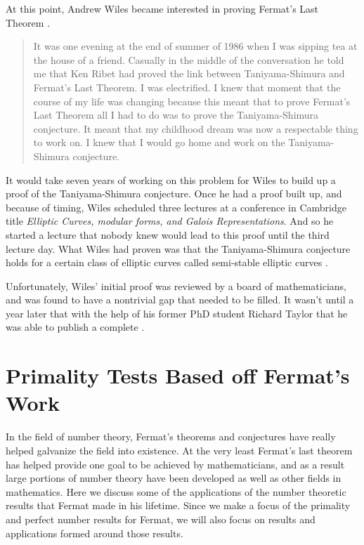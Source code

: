 \documentclass[11pt]{article}
\begin{document}
At this point, Andrew Wiles became interested in proving Fermat's Last
Theorem \cite{Kleiner}.
\begin{quote}
    It was one evening at the end of summer of 1986 when I was sipping tea
    at the house of a friend.
    Casually in the middle of the conversation he told me that Ken Ribet had
    proved the link between Taniyama-Shimura and Fermat's Last Theorem.
    I was electrified.
    I knew that moment that the course of my life was changing because this
    meant that to prove Fermat's Last Theorem all I had to do was to
    prove the Taniyama-Shimura conjecture.
    It meant that my childhood dream was now a respectable thing to work on.
    I knew that I would go home and work on the Taniyama-Shimura conjecture.
\end{quote}
It would take seven years of working on this problem for Wiles to build up a
proof of the Taniyama-Shimura conjecture.
Once he had a proof built up, and because of timing, Wiles scheduled three
lectures at a conference in Cambridge title \emph{Elliptic Curves, modular forms, and
Galois Representations}.
And so he started a lecture that nobody knew would lead to this proof until the
third lecture day.
What Wiles had proven was that the Taniyama-Shimura conjecture holds for a certain
class of elliptic curves called semi-stable elliptic curves \cite{Kleiner}.

Unfortunately, Wiles' initial proof was reviewed by a board of mathematicians, and
was found to have a nontrivial gap that needed to be filled.
It wasn't until a year later that with the help of his former PhD student 
Richard Taylor that he was able to publish a complete \cite{Kleiner}.


\section*{Primality Tests Based off Fermat's Work}
In the field of number theory, Fermat's theorems and conjectures have really
helped galvanize the field into existence.
At the very least Fermat's last theorem has helped provide one goal to be achieved
by mathematicians, and as a result large portions of number theory have been developed
as well as other fields in mathematics.
Here we discuss some of the applications of the number theoretic
results that Fermat made in his lifetime.
Since we make a focus of the primality and perfect number results for Fermat, we
will also focus on results and applications formed around those results.
\end{document}
